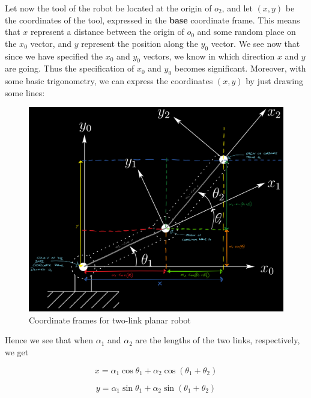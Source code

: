 	\newpage

	Let now the tool of the robot be located at the origin of $o_2$, and let $(x,y)$ be the coordinates of the tool, expressed in the \textbf{base} coordinate frame. This means that $x$ represent a distance between the origin of $o_0$ and some random place on the $x_{0}$ vector, and $y$ represent the position along the $y_{0}$ vector. We see now that since we have specified the $x_{0}$ and $y_{0}$ vectors, we know in which direction $x$ and $y$ are going. Thus the specification of $x_{0}$ and $y_{0}$ becomes significant. Moreover, with some basic trigonometry, we can express the coordinates $(x,y)$ by just drawing some lines:

	\begin{figure}[H]
		\centering
		\includegraphics[width=1\textwidth]{img/Figure1_25_drawing.png}
		\caption{Coordinate frames for two-link planar robot}
		\label{fig:Figure1_25_drawing}
	\end{figure}

	Hence we see that when $\alpha_1$ and $\alpha_2$ are the lengths of the two links, respectively, we get

	\begin{equation} \label{eq:positionX}
		x = \alpha_{1}\cos{\theta_1} + \alpha_{2}\cos(\theta_{1} + \theta_{2})
	\end{equation}

	\begin{equation} \label{eq:positionY}
		y = \alpha_{1}\sin{\theta_1} + \alpha_{2}\sin(\theta_{1} + \theta_{2})
	\end{equation}


